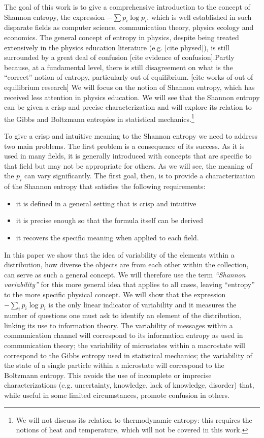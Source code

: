 \documentclass[iopart]{revtex4-1}
\begin{document}
The goal of this work is to give a comprehensive introduction to the concept of Shannon entropy, the expression $-\sum p_i \log p_i$, which is well established in such disparate fields as computer science, communication theory, physics\cite{Jaynes1957-1, Grandy} ecology and economics. The general concept of entropy in physics, despite being treated extensively in the physics education literature (e.g. [cite physed]), is still surrounded by a great deal of confusion [cite evidence of confusion]\cite{Swendsen, KishFerry}.Partly because, at a fundamental level, there is still disagreement on what is the ``correct'' notion of entropy, particularly out of equilibrium. [cite works of out of equilibrium research]  We will focus on the notion of Shannon entropy, which has received less attention in physics education. We will see that the Shannon entropy can be given a crisp and precise characterization and will explore its relation to the Gibbs and Boltzmann entropies in statistical mechanics.\footnote{We will not discuss its relation to thermodynamic entropy: this requires the notions of heat and temperature, which will not be covered in this work.}

To give a crisp and intuitive meaning to the Shannon entropy we need to address two main problems. The first problem is a consequence of its success. As it is used in many fields, it is generally introduced with concepts that are specific to that field but may not be appropriate for others. As we will see, the meaning of the $p_i$ can vary significantly. The first goal, then, is to provide a characterization of the Shannon entropy that satisfies the following requirements:
\begin{itemize}
	\item it is defined in a general setting that is crisp and intuitive
	\item it is precise enough so that the formula itself can be derived
	\item it recovers the specific meaning when applied to each field.
\end{itemize}
In this paper we show that the idea of variability of the elements within a distribution, how diverse the objects are from each other within the collection, can serve as such a general concept. We will therefore use the term \emph{``Shannon variability''} for this more general idea that applies to all cases, leaving ``entropy'' to the more specific physical concept. We will show that the expression $- \sum_i p_i \log p_i$ is the only linear indicator of variability and it measures the number of questions one must ask to identify an element of the distribution, linking its use to information theory. The variability of messages within a communication channel will correspond to its information entropy as used in communication theory; the variability of microstates within a macrostate will correspond to the Gibbs entropy used in statistical mechanics; the variability of the state of a single particle within a microstate will correspond to the Boltzmann entropy. This avoids the use of incomplete or imprecise characterizations (e.g. uncertainty, knowledge, lack of knowledge, disorder) that, while useful in some limited circumstances, promote confusion in others.
\end{document}
